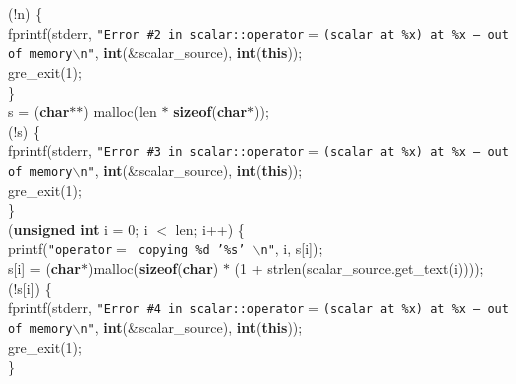 \begin{flushleft}
\hspace*{4\indentation}{\bf if} (!n) \{\mbox{}\\
\hspace*{8\indentation}fprintf(stderr, {\tt"Error \#2 in scalar::operator$=$(scalar at \%x) at \%x -- out of memory$\backslash$n"}, {\bf int}(\&scalar\_source), {\bf int}({\bf this}));\mbox{}\\
\hspace*{8\indentation}gre\_exit(1);\mbox{}\\
\hspace*{4\indentation}\}\mbox{}\\
\hspace*{4\indentation}s = ({\bf char}$\ast$$\ast$) malloc(len $\ast$ {\bf sizeof}({\bf char}$\ast$));\mbox{}\\
\hspace*{4\indentation}{\bf if} (!s) \{\mbox{}\\
\hspace*{8\indentation}fprintf(stderr, {\tt"Error \#3 in scalar::operator$=$(scalar at \%x) at \%x -- out of memory$\backslash$n"}, {\bf int}(\&scalar\_source), {\bf int}({\bf this}));\mbox{}\\
\hspace*{8\indentation}gre\_exit(1);\mbox{}\\
\hspace*{4\indentation}\}\mbox{}\\
\hspace*{4\indentation}{\bf for} ({\bf unsigned} {\bf int} i = 0; i $<$ len; i++) \{\mbox{}\\
\hspace*{8\indentation}printf({\tt"operator$=$ copying \%d '\%s' $\backslash$n"}, i, s[i]);\mbox{}\\
\hspace*{8\indentation}s[i] = ({\bf char}$\ast$)malloc({\bf sizeof}({\bf char}) $\ast$ (1 + strlen(scalar\_source.get\_text(i))));\mbox{}\\
\hspace*{8\indentation}{\bf if} (!s[i]) \{\mbox{}\\
\hspace*{8\indentation}fprintf(stderr, {\tt"Error \#4 in scalar::operator$=$(scalar at \%x) at \%x -- out of memory$\backslash$n"}, {\bf int}(\&scalar\_source), {\bf int}({\bf this}));\mbox{}\\
\hspace*{12\indentation}gre\_exit(1);\mbox{}\\
\hspace*{8\indentation}\}\mbox{}\\
$$
\end{flushleft}

